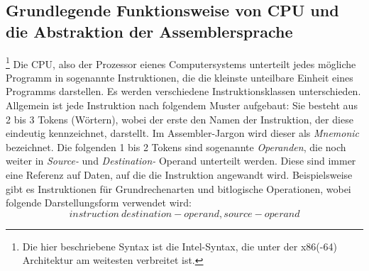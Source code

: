 \documentclass[11pt]{article}
\begin{document}
\subsection{Grundlegende Funktionsweise von CPU und die Abstraktion der Assemblersprache}\footnote{
		Die hier beschriebene Syntax ist die Intel-Syntax, die unter der x86(-64)
		Architektur am weitesten verbreitet ist.}
Die CPU, also der Prozessor eienes Computersystems unterteilt jedes mögliche Programm in sogenannte
Instruktionen, die die kleinste unteilbare Einheit eines Programms darstellen. Es werden
verschiedene Instruktionsklassen unterschieden. Allgemein ist jede Instruktion nach folgendem Muster
aufgebaut: Sie besteht aus 2 bis 3 Tokens (Wörtern), wobei der erste den Namen der Instruktion, der
diese eindeutig kennzeichnet, darstellt. Im Assembler-Jargon wird dieser als \textit{Mnemonic}
bezeichnet. Die folgenden 1 bis 2 Tokens sind sogenannte \textit{Operanden}, die noch weiter in
\textit{Source-} und \textit{Destination-} Operand unterteilt werden. Diese sind immer
eine Referenz auf Daten, auf die die Instruktion angewandt wird. Beispielsweise gibt es
Instruktionen für Grundrechenarten und bitlogische Operationen, wobei folgende Darstellungsform
verwendet wird: $$ instruction\ destination-operand, source-operand$$
\end{document}
